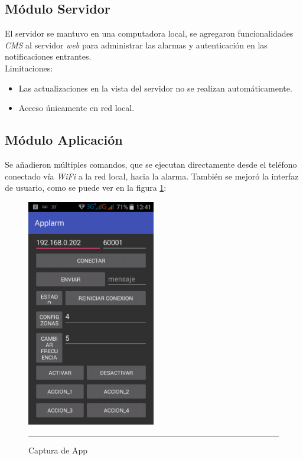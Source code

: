 
	\subsection{Módulo Servidor}

El servidor se mantuvo en una computadora local, se agregaron funcionalidades \textit{CMS} al servidor \textit{web} para administrar las alarmas y autenticación en las notificaciones entrantes. \\

Limitaciones:
\begin{itemize}
\item Las actualizaciones en la vista del servidor no se realizan automáticamente.
\item Acceso únicamente en red local.
\end{itemize}
\newpage


	\subsection{Módulo Aplicación}

Se añadieron múltiples comandos, que se ejecutan directamente desde el teléfono conectado vía \textit{WiFi} a la red local, hacia la alarma. También se mejoró la interfaz de usuario, como se puede ver en la figura \ref{app}:\\

\begin{figure}[htbp]
	\centering
		\includegraphics[width=0.5\textwidth]{Figures/app.png}
		\rule{35em}{1.5pt}
	\caption[Captura de App]{Captura de App}
\label{app}
\end{figure}
\newpage

